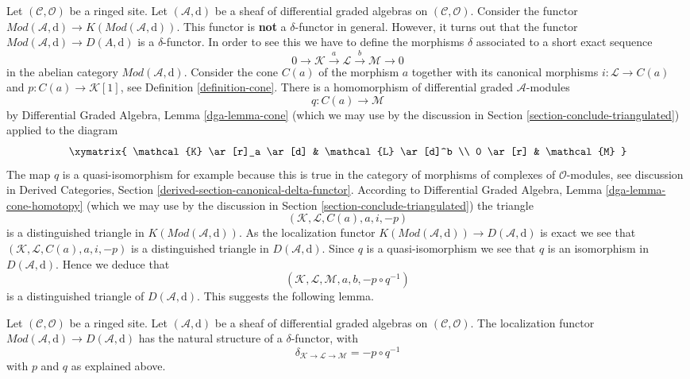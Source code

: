 \noindent
Let $(\mathcal{C}, \mathcal{O})$ be a ringed site. Let
$(\mathcal{A}, \text{d})$ be a sheaf of differential graded algebras
on $(\mathcal{C}, \mathcal{O})$.
Consider the functor
$\textit{Mod}(\mathcal{A}, \text{d}) \to
K(\textit{Mod}(\mathcal{A}, \text{d}))$.
This functor is {\bf not} a $\delta$-functor in general.
However, it turns out that the functor
$\textit{Mod}(\mathcal{A}, \text{d}) \to D(A, \text{d})$ is a
$\delta$-functor. In order to see this we have to define
the morphisms $\delta$ associated to a short exact sequence
$$
0 \to \mathcal{K} \xrightarrow{a} \mathcal{L} \xrightarrow{b} \mathcal{M} \to 0
$$
in the abelian category $\textit{Mod}(\mathcal{A}, \text{d})$.
Consider the cone $C(a)$ of the morphism $a$ together with its
canonical morphisms $i : \mathcal{L} \to C(a)$ and
$p : C(a) \to \mathcal{K}[1]$, see Definition \ref{definition-cone}.
There is a homomorphism of differential graded $\mathcal{A}$-modules
$$
q : C(a) \longrightarrow \mathcal{M}
$$
by Differential Graded Algebra, Lemma \ref{dga-lemma-cone}
(which we may use by the discussion in
Section \ref{section-conclude-triangulated})
applied to the diagram
$$
\xymatrix{
\mathcal{K} \ar[r]_a \ar[d] &
\mathcal{L} \ar[d]^b \\
0 \ar[r] &
\mathcal{M}
}
$$
The map $q$ is a quasi-isomorphism for example because this is true in
the category of morphisms of complexes of $\mathcal{O}$-modules, see
discussion in
Derived Categories, Section \ref{derived-section-canonical-delta-functor}.
According to Differential Graded Algebra, Lemma \ref{dga-lemma-cone-homotopy}
(which we may use by the discussion in
Section \ref{section-conclude-triangulated})
the triangle
$$
(\mathcal{K}, \mathcal{L}, C(a), a, i, -p)
$$
is a distinguished triangle in $K(\textit{Mod}(\mathcal{A}, \text{d}))$.
As the localization functor
$K(\textit{Mod}(\mathcal{A}, \text{d})) \to D(\mathcal{A}, \text{d})$ is
exact we see that $(\mathcal{K}, \mathcal{L}, C(a), a, i, -p)$
is a distinguished
triangle in $D(\mathcal{A}, \text{d})$. Since $q$ is a quasi-isomorphism
we see that $q$ is an isomorphism in $D(\mathcal{A}, \text{d})$.
Hence we deduce that
$$
(\mathcal{K}, \mathcal{L}, \mathcal{M}, a, b, -p \circ q^{-1})
$$
is a distinguished triangle of $D(\mathcal{A}, \text{d})$.
This suggests the following lemma.

\begin{lemma}
\label{lemma-derived-canonical-delta-functor}
Let $(\mathcal{C}, \mathcal{O})$ be a ringed site. Let
$(\mathcal{A}, \text{d})$ be a sheaf of differential graded algebras
on $(\mathcal{C}, \mathcal{O})$. The localization functor
$\textit{Mod}(\mathcal{A}, \text{d}) \to D(\mathcal{A}, \text{d})$
has the natural structure of a $\delta$-functor, with
$$
\delta_{\mathcal{K} \to \mathcal{L} \to \mathcal{M}} = - p \circ q^{-1}
$$
with $p$ and $q$ as explained above.
\end{lemma}

